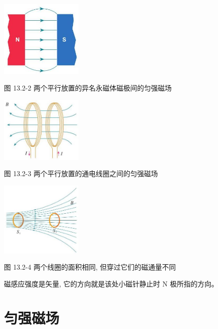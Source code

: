 \documentclass[10pt]{article}
\begin{document}
\begin{mdframed}

\begin{center}
\includegraphics[max width=0.3\textwidth]{images/01911d5f-8e38-70c0-b5b8-2b399bd115b6_116_275070.jpg}
\end{center}

图 13.2-2 两个平行放置的异名永磁体磁极间的匀强磁场

\begin{center}
\includegraphics[max width=0.3\textwidth]{images/01911d5f-8e38-70c0-b5b8-2b399bd115b6_116_724156.jpg}
\end{center}

图 13.2-3 两个平行放置的通电线圈之间的匀强磁场

\begin{center}
\includegraphics[max width=0.3\textwidth]{images/01911d5f-8e38-70c0-b5b8-2b399bd115b6_116_222865.jpg}
\end{center}

图 13.2-4 两个线圈的面积相同, 但穿过它们的磁通量不同

\end{mdframed}

磁感应强度是矢量, 它的方向就是该处小磁针静止时 \(\mathrm{N}\) 极所指的方向。

\section*{匀强磁场}
\end{document}
